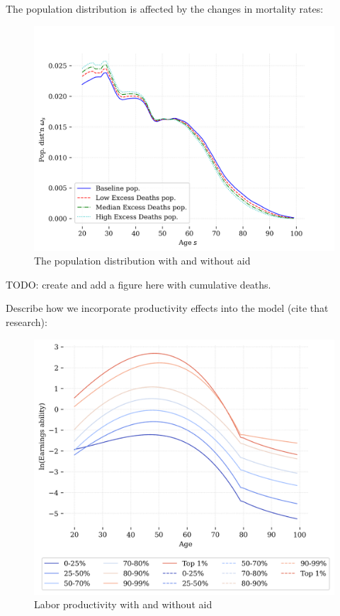 \documentclass[letterpaper,12pt]{article}
\theoremstyle{definition}
\begin{document}
\begin{spacing}{1.5}
The population distribution is affected by the changes in mortality rates:
\begin{figure}[h]
    \caption{The population distribution with and without aid}
    \centering
    \includegraphics[scale=0.75]{./tables_figures/pop_dist_2050.png}
\end{figure}

TODO: create and add a figure here with cumulative deaths.

Describe how we incorporate productivity effects into the model (cite that research):

\begin{figure}[h]
    \caption{Labor productivity with and without aid}
    \centering
    \includegraphics[scale=0.75]{./tables_figures/ability_profiles.png}
\end{figure}


\end{spacing}
\end{document}
